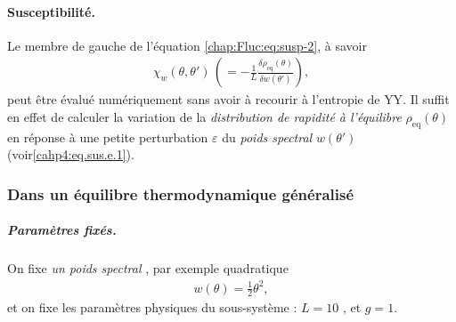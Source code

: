 \paragraph{Susceptibilité.}

Le membre de gauche de l’équation \eqref{chap:Fluc:eq:susp-2}, à savoir
\begin{eqnarray*}
\chi_w(\theta, \theta') \, \left ( =  - \frac{1}{L} \frac{\delta \rho_{\mathrm{eq}}(\theta)}{\delta w(\theta')} \right ) ,
\end{eqnarray*}
peut être évalué numériquement sans avoir à recourir à l'entropie de \gls{YY}. Il suffit en effet de calculer la variation de la {\em distribution de rapidité à l'équilibre} $\rho_{\mathrm{eq}}(\theta)$ en réponse à une petite perturbation $\varepsilon$  du {\em poids spectral} $w(\theta')$ (voir\eqref{cahp4:eq.sus.e.1}).



%



\subsubsection{Dans un équilibre thermodynamique généralisé}

\subparagraph{Paramètres fixés.}
On fixe {\em un poids spectral} , par exemple quadratique
\begin{eqnarray}
	w(\theta) = \tfrac{1}{2} \theta^2,
\end{eqnarray}
et on fixe les paramètres physiques du sous-système : \( L = 10 \) , et \( g = 1 \).


